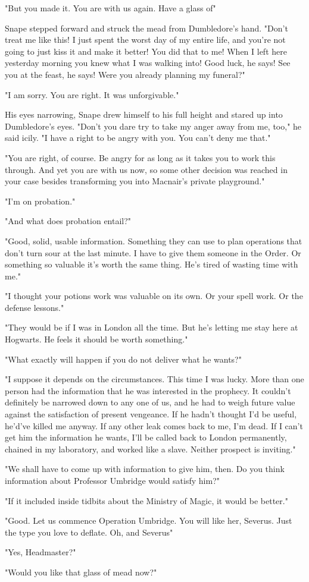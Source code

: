"But you made it. You are with us again. Have a glass of{\el}"

Snape stepped forward and struck the mead from Dumbledore's hand. "Don't treat me like this! I just spent the worst day of my entire life, and you're not going to just kiss it and make it better! You did that to me! When I left here yesterday morning you knew what I was walking into! Good luck, he says! See you at the feast, he says! Were you already planning my funeral?"

"I am sorry. You are right. It was unforgivable."

His eyes narrowing, Snape drew himself to his full height and stared up into Dumbledore's eyes. "Don't you dare try to take my anger away from me, too," he said icily. "I have a right to be angry with you. You can't deny me that."

"You are right, of course. Be angry for as long as it takes you to work this through. And yet you are with us now, so some other decision was reached in your case besides transforming you into Macnair's private playground."

"I'm on probation."

"And what does probation entail?"

"Good, solid, usable information. Something they can use to plan operations that don't turn sour at the last minute. I have to give them someone in the Order. Or something so valuable it's worth the same thing. He's tired of wasting time with me."

"I thought your potions work was valuable on its own. Or your spell work. Or the defense lessons."

"They would be if I was in London all the time. But he's letting me stay here at Hogwarts. He feels it should be worth something."

"What exactly will happen if you do not deliver what he wants?"

"I suppose it depends on the circumstances. This time I was lucky. More than one person had the information that he was interested in the prophecy. It couldn't definitely be narrowed down to any one of us, and he had to weigh future value against the satisfaction of present vengeance. If he hadn't thought I'd be useful, he'd've killed me anyway. If any other leak comes back to me, I'm dead. If I can't get him the information he wants, I'll be called back to London permanently, chained in my laboratory, and worked like a slave. Neither prospect is inviting."

"We shall have to come up with information to give him, then. Do you think information about Professor Umbridge would satisfy him?"

"If it included inside tidbits about the Ministry of Magic, it would be better."

"Good. Let us commence Operation Umbridge. You will like her, Severus. Just the type you love to deflate. Oh, and Severus{\el}"

"Yes, Headmaster?"

"Would you like that glass of mead now?" 


